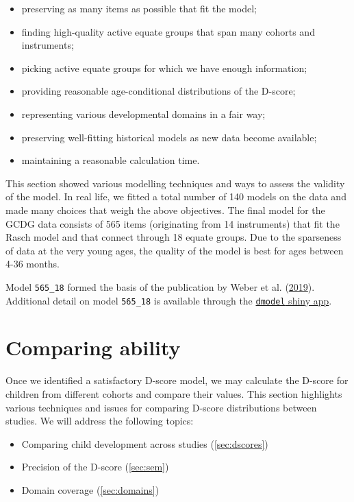 \documentclass[
]{book}
\providecommand{\tightlist}{%
  \setlength{\itemsep}{0pt}\setlength{\parskip}{0pt}}
\begin{document}
\begin{itemize}
\tightlist
\item
  preserving as many items as possible that fit the model;
\item
  finding high-quality active equate groups that span many cohorts and instruments;
\item
  picking active equate groups for which we have enough information;
\item
  providing reasonable age-conditional distributions of the D-score;
\item
  representing various developmental domains in a fair way;
\item
  preserving well-fitting historical models as new data become available;
\item
  maintaining a reasonable calculation time.
\end{itemize}

This section showed various modelling techniques and ways to assess the validity of the model. In real life, we fitted a total number of 140 models on the data and made many choices that weigh the above objectives. The final model for the GCDG data consists of 565 items (originating from 14 instruments) that fit the Rasch model and that connect through 18 equate groups. Due to the sparseness of data at the very young ages, the quality of the model is best for ages between 4-36 months.

Model \texttt{565\_18} formed the basis of the publication by Weber et al. (\protect\hyperlink{ref-Weber2019}{2019}). Additional detail on model \texttt{565\_18} is available through the \href{https://tnochildhealthstatistics.shinyapps.io/dmodel/}{\texttt{dmodel} shiny app}.

\hypertarget{ch:ability}{%
\chapter{Comparing ability}\label{ch:ability}}

Once we identified a satisfactory D-score model, we may calculate the D-score for children from different cohorts and compare their values. This section highlights various techniques and issues for comparing D-score distributions between studies. We will address the following topics:

\begin{itemize}
\tightlist
\item
  Comparing child development across studies (\ref{sec:dscores})
\item
  Precision of the D-score (\ref{sec:sem})
\item
  Domain coverage (\ref{sec:domains})
\end{itemize}
\end{document}
